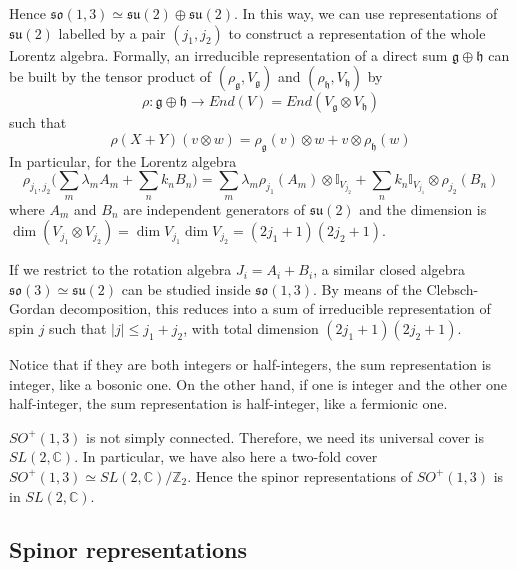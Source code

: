    Hence $\mathfrak{so}(1,3) \simeq \mathfrak{su}(2) \oplus \mathfrak{su}(2)$. In this way, we can use representations of $\mathfrak{su}(2)$ labelled by a pair $(j_1, j_2)$ to construct a representation of the whole Lorentz algebra. Formally, an irreducible representation of a direct sum $\mathfrak g \oplus \mathfrak h$ can be built by the tensor product of $(\rho_{\mathfrak g}, V_{\mathfrak g})$ and $(\rho_{\mathfrak h}, V_{\mathfrak h})$ by
    \begin{equation*}
        \rho \colon \mathfrak g \oplus \mathfrak h \rightarrow End(V) = End(V_{\mathfrak g} \otimes V_{\mathfrak h})
    \end{equation*}
    such that 
    \begin{equation*}
        \rho(X+Y) (v \otimes w) = \rho_{\mathfrak g}(v) \otimes w + v \otimes \rho_{\mathfrak h}(w)
    \end{equation*}
    In particular, for the Lorentz algebra 
    \begin{equation*}
        \rho_{j_1, j_2} \Big ( \sum_m \lambda_m A_m + \sum_n k_n B_n \Big) = \sum_m \lambda_m \rho_{j_1} (A_m) \otimes \mathbb I_{V_{j_2}} + \sum_n k_n \mathbb I_{V_{j_1}} \otimes \rho_{j_2} (B_n)
    \end{equation*}
    where $A_m$ and $B_n$ are independent generators of $\mathfrak{su}(2)$ and the dimension is $\dim (V_{j_1} \otimes V_{j_2}) = \dim V_{j_1} \dim V_{j_2} = (2j_1 + 1)(2j_2 + 1)$.

    If we restrict to the rotation algebra $J_i = A_i + B_i$, a similar closed algebra $\mathfrak{so}(3) \simeq \mathfrak{su}(2)$ can be studied inside $\mathfrak{so}(1,3)$. By means of the Clebsch-Gordan decomposition, this reduces into a sum of irreducible representation of spin $j$ such that $|j| \leq j_1 + j_2$, with total dimension $(2j_1 + 1) (2j_2 + 1)$.

    Notice that if they are both integers or half-integers, the sum representation is integer, like a bosonic one. On the other hand, if one is integer and the other one half-integer, the sum representation is half-integer, like a fermionic one. 

    $SO^+(1,3)$ is not simply connected. Therefore, we need its universal cover is $SL(2, \mathbb C)$. In particular, we have also here a two-fold cover $SO^+(1,3) \simeq SL(2, \mathbb C)/\mathbb Z_2$. Hence the spinor representations of $SO^+(1,3)$ is in $SL(2, \mathbb C)$.

\subsection{Spinor representations}

